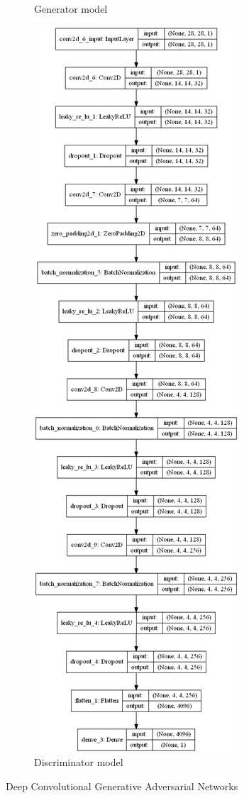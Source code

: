 \documentclass[conference]{IEEEtran}
\begin{document}
\begin{figure}
\begin{subfigure}[b]{\columnwidth}
         \caption{Generator model}
         \label{fig:gen_dcgan}
     \end{subfigure}
     \hfill
     \begin{subfigure}[b]{\columnwidth}
         \centering
         \includegraphics[width=\textwidth,height=\textheight,keepaspectratio]{discriminator_dcgan.png}
         \caption{Discriminator model}
         \label{fig:dis_dcgan}
     \end{subfigure}
        \caption{Deep Convolutional Generative Adversarial Networks}
        \label{fig:dcgan_mod}
\end{figure}
\end{document}
